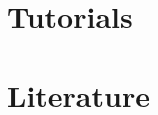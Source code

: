 \documentclass[signature]{deltares_manual}
\begin{document}
\chapter{Tutorials}
\label{chap:tutorials}


\chapter{Literature}  
\label{chap:literature}




\cleardoublepage
%
\newpage
\pagestyle{empty}
\mbox{}

\end{document}
